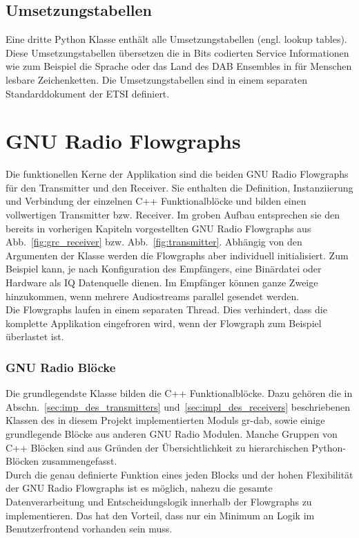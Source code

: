 \subsection{Umsetzungstabellen}
Eine dritte Python Klasse enthält alle Umsetzungstabellen (engl. lookup tables). Diese Umsetzungstabellen übersetzen die in Bits codierten Service Informationen wie zum Beispiel die Sprache oder das Land des DAB Ensembles in für Menschen lesbare Zeichenketten. Die Umsetzungstabellen sind in einem separaten Standarddokument der ETSI \cite{etsi:registered_tables} definiert.

\section{GNU Radio Flowgraphs}
Die funktionellen Kerne der Applikation sind die beiden GNU Radio Flowgraphs für den Transmitter und den Receiver. Sie enthalten die Definition, Instanziierung und Verbindung der einzelnen C++ Funktionalblöcke und bilden einen vollwertigen Transmitter bzw. Receiver. Im groben Aufbau entsprechen sie den bereits in vorherigen Kapiteln vorgestellten GNU Radio Flowgraphs aus Abb.~\ref{fig:grc_receiver} bzw. Abb.~\ref{fig:transmitter}. Abhängig von den Argumenten der Klasse werden die Flowgraphs aber individuell initialisiert. Zum Beispiel kann, je nach Konfiguration des Empfängers, eine Binärdatei oder Hardware als IQ Datenquelle dienen. Im Empfänger können ganze Zweige hinzukommen, wenn mehrere Audiostreams parallel gesendet werden.\\
Die Flowgraphs laufen in einem separaten Thread. Dies verhindert, dass die komplette Applikation eingefroren wird, wenn der Flowgraph zum Beispiel überlastet ist.

\subsubsection{GNU Radio Blöcke}
Die grundlegendste Klasse bilden die C++ Funktionalblöcke. Dazu gehören die in Abschn.~\ref{sec:imp_des_transmitters} und~\ref{sec:impl_des_receivers} beschriebenen Klassen des in diesem Projekt implementierten Moduls gr-dab, sowie einige grundlegende Blöcke aus anderen GNU Radio Modulen. Manche Gruppen von C++ Blöcken sind aus Gründen der Übersichtlichkeit zu hierarchischen Python-Blöcken zusammengefasst.\\

Durch die genau definierte Funktion eines jeden Blocks und der hohen Flexibilität der GNU Radio Flowgraphs ist es möglich, nahezu die gesamte Datenverarbeitung und Entscheidungslogik innerhalb der Flowgraphs zu implementieren. Das hat den Vorteil, dass nur ein Minimum an Logik im Benutzerfrontend vorhanden sein muss.


